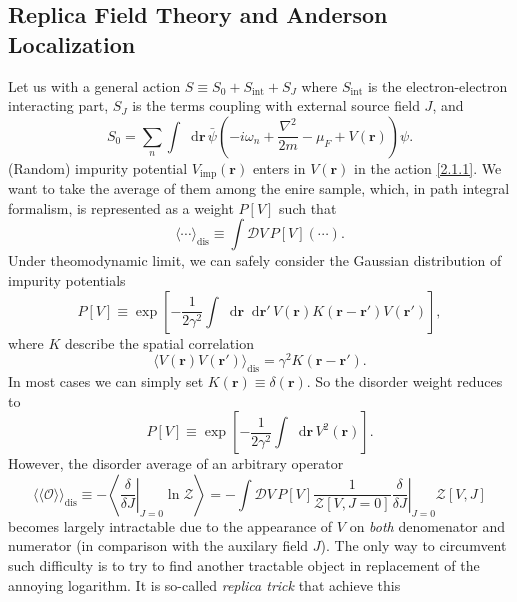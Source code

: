 \documentclass[10pt,nofootinbib,letterpaper]{revtex4}
\newcommand*\dd{\mathop{}\!\mathrm{d}}
\def\Z{\mathcal{Z}}
\def\D{\mathcal{D}}
\begin{document}
	\subsection{Replica Field Theory and Anderson Localization}
		Let us with a general action $S\equiv S_0+S_\text{int}+S_J$ where $S_\text{int}$ is the electron-electron interacting part, $S_J$ is the terms coupling with external source field $J$, and
		\begin{equation}\label{2.1.1}
			S_0=\sum_n\int\dd\bm{r}\,\bar{\psi}\left(-i\omega_n+\dfrac{\nabla^2}{2m}-\mu_F+V(\bm{r})\right) \psi.
		\end{equation}
		(Random) impurity potential $V_{\text{imp}}(\bm{r})$ enters in $V(\bm{r})$ in the action \eqref{2.1.1}. We want to take the average of them among the enire sample, which, in path integral formalism, is represented as a weight $P[V]$ such that
		\begin{equation*}
			\langle\cdots\rangle_{\text{dis}}\equiv\int\D V\,P[V](\cdots).
		\end{equation*}
		Under theomodynamic limit, we can safely consider the Gaussian distribution of impurity potentials
		\begin{equation*}
			P[V]\equiv\exp \left[-\dfrac{1}{2\gamma^2}\int\dd\bm{r}\dd\bm{r'}\,V(\bm{r})K(\bm{r}-\bm{r'})V(\bm{r'})\right],
		\end{equation*}
		where $K$ describe the spatial correlation
		\begin{equation*}
			\langle V(\bm{r})V(\bm{r'})\rangle_{\text{dis}}=\gamma^2 K(\bm{r}-\bm{r'}).
		\end{equation*}
		In most cases we can simply set $K(\bm{r})\equiv\delta(\bm{r})$. So the disorder weight reduces to
		\begin{equation}\label{2.1.2}
			P[V]\equiv\exp \left[-\dfrac{1}{2\gamma^2}\int\dd\bm{r}\,V^2(\bm{r})\right].
		\end{equation}
		\indent However, the disorder average of an arbitrary operator
		\begin{equation*}
			\langle\langle\mathcal{O}\rangle\rangle_{\text{dis}}\equiv-\left\langle\left.\dfrac{\delta}{\delta J}\right|_{J=0}\ln\Z\right\rangle=-\int\D V\,P[V]\dfrac{1}{\Z[V,J=0]}\left.\dfrac{\delta}{\delta J}\right|_{J=0}\Z[V,J]
		\end{equation*}
		becomes largely intractable due to the appearance of $V$ on \emph{both} denomenator and numerator (in comparison with the auxilary field $J$). The only way to circumvent such difficulty is to try to find another tractable object in replacement of the annoying logarithm. It is so-called \emph{replica trick} \cite{edwards1975theory} that achieve this 
\end{document}
